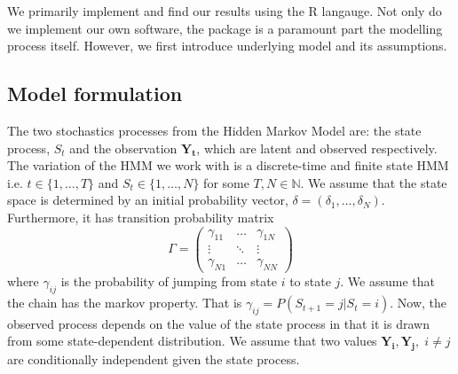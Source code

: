 We primarily implement and find our results using the R langauge.
Not only do we implement our own software, the package  \cite{momentuHMM} is a paramount part the modelling process itself. However, we first introduce underlying model and its assumptions.
\subsection*{Model formulation}
The two stochastics processes from the Hidden Markov Model are: the state process, $S_t$ and the observation $\mathbf{Y_t}$, which are latent and observed respectively. The variation of the HMM we work with is a discrete-time and finite state HMM i.e. $t\in\{1,\dots , T\}$ and $S_t\in\{1,\dots , N\}$ for some $T, N\in\mathbb{N}$. We assume that the state space is determined by an initial probability vector, $\delta = \left(\delta_1,\dots, \delta_N \right)$. Furthermore, it has transition probability matrix
\[
    \Gamma = \begin{pmatrix}
        \gamma_{11} & \dots &  \gamma_{1N} \\
        \vdots & \ddots & \vdots \\
        \gamma_{N1} & \dots & \gamma_{NN}
    \end{pmatrix}
\]
where $\gamma_{ij}$ is the probability of jumping from state $i$ to state $j$. We assume that the chain has the markov property. That is $\gamma_{ij} = P\left(S_{t+1} = j | S_t = i\right)$. Now, the observed process depends on the value of the state process in that it is drawn from some state-dependent distribution. We assume that two values $\mathbf{Y_i}, \mathbf{Y_j},\; i\neq j$ are conditionally independent given the state process.